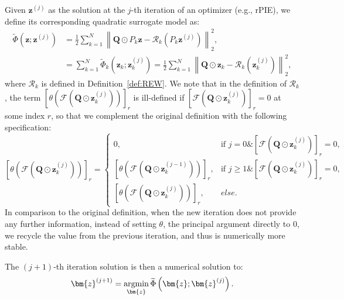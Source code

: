 \documentclass{article}
\numberwithin{equation}{section}
\begin{document}
Given $\bm{z}^{(j)}$ as the solution at the $j$-th iteration of an optimizer (e.g., rPIE), we define its corresponding quadratic surrogate model as:
\begin{equation}\label{eqn:quadratic_surrogate}
\begin{aligned}
    \widetilde{\Phi}\left(\bm{z} ; \bm{z}^{(j)}\right) &= \frac{1}{2} \sum_{k=1}^N \left\|\bm{Q}\odot P_k\bm{z} - \mathcal{R}_k\left(P_k\bm{z}^{(j)}\right)\right\|_2^2,\\
    &=\sum_{k=1}^N \widetilde{\Phi}_k\left(\bm{z}_k ; \bm{z}_k^{(j)}\right) = \frac{1}{2} \sum_{k=1}^N \left\|\bm{Q}\odot \bm{z}_k - \mathcal{R}_k\left(\bm{z}_k^{(j)}\right)\right\|_2^2,
\end{aligned}
\end{equation}
where $\mathcal{R}_k$ is defined in Definition~\ref{def:REW}. We note that in the definition of $\mathcal{R}_k$, the term $\left[\theta\left(\mathcal{F}\left(\bm{Q}\odot\bm{z}_k^{(j)}\right)\right)\right]_r$ is ill-defined if  $\left[\mathcal{F}\left(\bm{Q}\odot\bm{z}_k^{(j)}\right)\right]_r=0$ at some index $r$, so that we complement the original definition with the following specification:
\begin{equation}\label{eqn:specification}
\left[\theta\left(\mathcal{F}\left(\bm{Q}\odot\bm{z}_k^{(j)}\right)\right)\right]_r =
\begin{cases}
0, & \text{if } j=0 \& \left[\mathcal{F}\left(\bm{Q}\odot\bm{z}_k^{(j)}\right)\right]_r=0, \\
\left[\theta\left(\mathcal{F}\left(\bm{Q}\odot\bm{z}_k^{(j-1)}\right)\right)\right]_r, & \text{if } j\geq 1 \& \left[\mathcal{F}\left(\bm{Q}\odot\bm{z}_k^{(j)}\right)\right]_r=0,\\
\left[\theta\left(\mathcal{F}\left(\bm{Q}\odot\bm{z}_k^{(j)}\right)\right)\right]_r, & else.
\end{cases}
\end{equation}
In comparison to the original definition, when the new iteration does not provide any further information, instead of setting $\theta$, the principal argument directly to $0$, we recycle the value from the previous iteration, and thus is numerically more stable.

The $(j+1)$-th iteration solution is then a numerical solution to:
\begin{equation}\label{eqn:surrogate_minimization}
\bm{z}^{(j+1)} = \operatornamewithlimits{argmin}_{\bm{z}} \widetilde{\Phi}\left(\bm{z} ; \bm{z}^{(j)}\right).
\end{equation}
\end{document}
